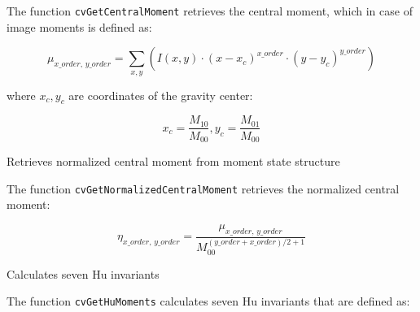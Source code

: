 The function \texttt{cvGetCentralMoment} retrieves the central moment, which in case of image moments is defined as:

\[
\mu_{x\_order, \, y\_order} = \sum_{x,y} (I(x,y) \cdot (x-x_c)^{x\_order} \cdot (y-y_c)^{y\_order})
\]

where $x_c,y_c$ are coordinates of the gravity center:

\[
x_c=\frac{M_{10}}{M_{00}}, y_c=\frac{M_{01}}{M_{00}}
\]

\label{GetNormalizedCentralMoment}

Retrieves normalized central moment from moment state structure


\begin{description}
\end{description}

The function \texttt{cvGetNormalizedCentralMoment} retrieves the normalized central moment:

\[
\eta_{x\_order, \, y\_order} = \frac{\mu_{x\_order, \, y\_order}}{M_{00}^{(y\_order+x\_order)/2+1}}
\]

\label{GetHuMoments}

Calculates seven Hu invariants


\begin{description}
\end{description}

The function \texttt{cvGetHuMoments} calculates seven Hu invariants that are defined as:

